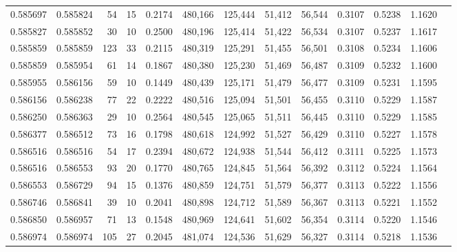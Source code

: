\begin{tabular}{rrrrrrrrrrrrr}
0.585697 & 0.585824 &    54 &  15 &                                     0.2174 & 480,166 & 125,444 &  51,412 &  56,544 & 0.3107 & 0.5238 & 1.1620 \\
0.585827 & 0.585852 &    30 &  10 &                                     0.2500 & 480,196 & 125,414 &  51,422 &  56,534 & 0.3107 & 0.5237 & 1.1617 \\
0.585859 & 0.585859 &   123 &  33 &                                     0.2115 & 480,319 & 125,291 &  51,455 &  56,501 & 0.3108 & 0.5234 & 1.1606 \\
0.585859 & 0.585954 &    61 &  14 &                                     0.1867 & 480,380 & 125,230 &  51,469 &  56,487 & 0.3109 & 0.5232 & 1.1600 \\
0.585955 & 0.586156 &    59 &  10 &                                     0.1449 & 480,439 & 125,171 &  51,479 &  56,477 & 0.3109 & 0.5231 & 1.1595 \\
0.586156 & 0.586238 &    77 &  22 &                                     0.2222 & 480,516 & 125,094 &  51,501 &  56,455 & 0.3110 & 0.5229 & 1.1587 \\
0.586250 & 0.586363 &    29 &  10 &                                     0.2564 & 480,545 & 125,065 &  51,511 &  56,445 & 0.3110 & 0.5229 & 1.1585 \\
0.586377 & 0.586512 &    73 &  16 &                                     0.1798 & 480,618 & 124,992 &  51,527 &  56,429 & 0.3110 & 0.5227 & 1.1578 \\
0.586516 & 0.586516 &    54 &  17 &                                     0.2394 & 480,672 & 124,938 &  51,544 &  56,412 & 0.3111 & 0.5225 & 1.1573 \\
0.586516 & 0.586553 &    93 &  20 &                                     0.1770 & 480,765 & 124,845 &  51,564 &  56,392 & 0.3112 & 0.5224 & 1.1564 \\
0.586553 & 0.586729 &    94 &  15 &                                     0.1376 & 480,859 & 124,751 &  51,579 &  56,377 & 0.3113 & 0.5222 & 1.1556 \\
0.586746 & 0.586841 &    39 &  10 &                                     0.2041 & 480,898 & 124,712 &  51,589 &  56,367 & 0.3113 & 0.5221 & 1.1552 \\
0.586850 & 0.586957 &    71 &  13 &                                     0.1548 & 480,969 & 124,641 &  51,602 &  56,354 & 0.3114 & 0.5220 & 1.1546 \\
0.586974 & 0.586974 &   105 &  27 &                                     0.2045 & 481,074 & 124,536 &  51,629 &  56,327 & 0.3114 & 0.5218 & 1.1536 \\

\end{tabular}
